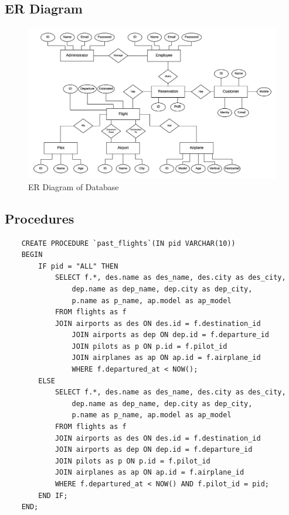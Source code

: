 \documentclass[12pt,a4paper]{article}
\begin{document}
\subsection{ER Diagram}
    \begin{figure}[h!]
    \centering
    \includegraphics[width=135mm]{cmpe321_p3_ER.png}
    \caption{ER Diagram of Database}
    \label{fig:ss7}
    \end{figure}

\subsection{Procedures}
\begin{code}
\begin{verbatim}
    CREATE PROCEDURE `past_flights`(IN pid VARCHAR(10))
    BEGIN
        IF pid = "ALL" THEN
            SELECT f.*, des.name as des_name, des.city as des_city,
                dep.name as dep_name, dep.city as dep_city,
                p.name as p_name, ap.model as ap_model
            FROM flights as f
            JOIN airports as des ON des.id = f.destination_id
                JOIN airports as dep ON dep.id = f.departure_id
                JOIN pilots as p ON p.id = f.pilot_id
                JOIN airplanes as ap ON ap.id = f.airplane_id
                WHERE f.departured_at < NOW();
        ELSE
            SELECT f.*, des.name as des_name, des.city as des_city,
                dep.name as dep_name, dep.city as dep_city,
                p.name as p_name, ap.model as ap_model
            FROM flights as f
            JOIN airports as des ON des.id = f.destination_id
            JOIN airports as dep ON dep.id = f.departure_id
            JOIN pilots as p ON p.id = f.pilot_id
            JOIN airplanes as ap ON ap.id = f.airplane_id
            WHERE f.departured_at < NOW() AND f.pilot_id = pid;
        END IF;
    END;
\end{verbatim}
\end{code}
\end{document}
